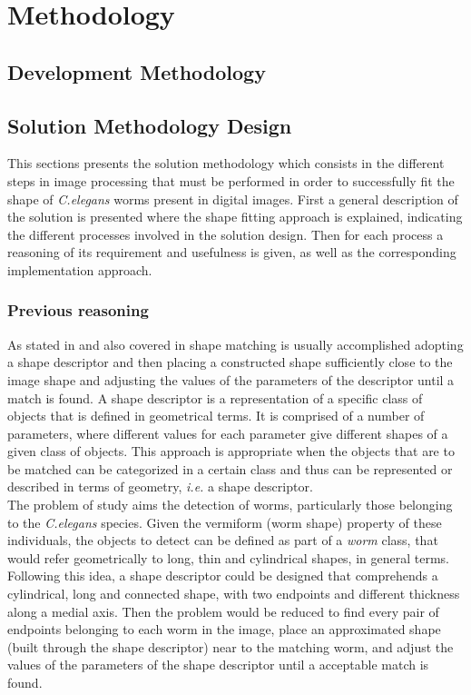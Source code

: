 \cleardoublepage  
\chapter{Methodology}
\label{chap:methodology}

\section{Development Methodology}
\label{sec:devmet}

\section{Solution Methodology Design}
\label{sec:solmet}

This sections presents the solution methodology which consists in the different
steps in image processing that must be performed in order to successfully fit the shape of 
\emph{C.elegans} worms present in digital images. First a general description
of the solution is presented where the shape fitting approach is explained, indicating
the different processes involved in the solution design. Then for each process 
a reasoning of its requirement and usefulness is given, as well as 
the corresponding 
implementation approach.

\subsection{Previous reasoning}
\label{sec:reasoning}

As stated in \cite{binaryshape} and also covered in
\cite{deformable,matching2,matchingbook} shape 
matching is usually accomplished adopting a shape
descriptor and then placing a constructed shape sufficiently 
close to the image shape and adjusting the values of 
the parameters of the descriptor until a match is found.
A shape descriptor is a representation of a 
specific class of objects that is defined in geometrical
terms. It is comprised of a number of parameters, where 
different values for each parameter give different 
shapes of a given class of objects.
This approach is appropriate when the objects
that are to be matched can be categorized in a certain 
class and thus can be represented or described in terms
of geometry, \emph{i.e.} a shape descriptor.\\

The problem of study aims the detection of worms,
particularly those belonging to the \emph{C.elegans} species. Given
the vermiform (worm shape) property of these individuals,
the objects to detect can be defined as part of a 
\emph{worm} class,
that would refer geometrically to long, thin and cylindrical 
shapes, in 
general terms. Following this idea, a shape descriptor could be
designed that comprehends a cylindrical, long and connected
shape, with two endpoints and different thickness along a medial
axis. Then the problem would be reduced to find every pair of
endpoints belonging to each worm in the image, place an approximated
shape (built through the shape descriptor) near to the matching worm,
and adjust the values of the parameters of the shape descriptor until
a acceptable match is found.\\

